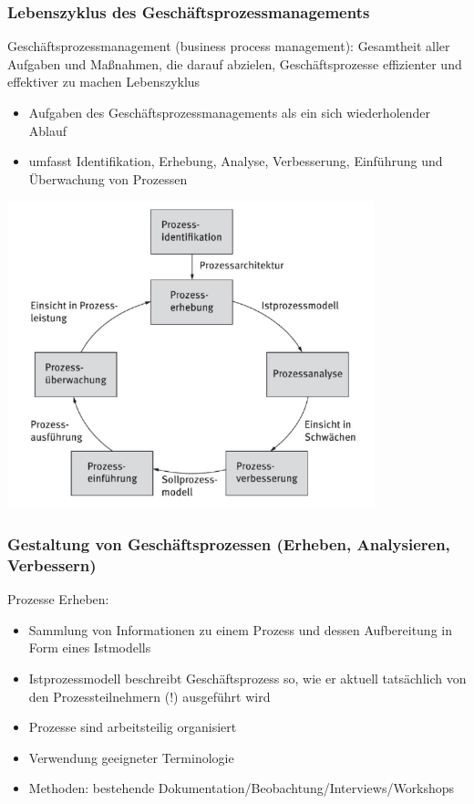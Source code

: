 \subsubsection{Lebenszyklus des Geschäftsprozessmanagements}
Geschäftsprozessmanagement (business process management): Gesamtheit aller Aufgaben und Maßnahmen, die darauf abzielen, Geschäftsprozesse effizienter und effektiver zu machen
Lebenszyklus
\begin{itemize}
  \item Aufgaben des Geschäftsprozessmanagements als ein sich wiederholender Ablauf
  \item umfasst Identifikation, Erhebung, Analyse, Verbesserung, Einführung und Überwachung von Prozessen
\end{itemize}
\includegraphics[width=0.8\textwidth]{assets/LebenszyklusGPM.PNG}
\subsubsection{Gestaltung von Geschäftsprozessen (Erheben, Analysieren, Verbessern)}
Prozesse Erheben:
\begin{itemize}
  \item Sammlung von Informationen zu einem Prozess und dessen Aufbereitung in Form eines Istmodells
  \item Istprozessmodell beschreibt Geschäftsprozess so, wie er aktuell tatsächlich von den Prozessteilnehmern (!) ausgeführt wird
  \item Prozesse sind arbeitsteilig organisiert
  \item Verwendung geeigneter Terminologie
  \item Methoden: bestehende Dokumentation/Beobachtung/Interviews/Workshops
\end{itemize}

